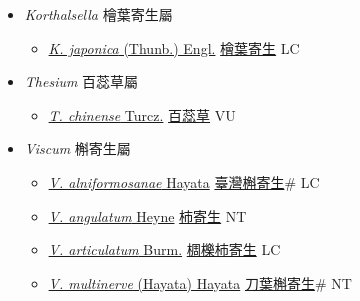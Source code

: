 
  \begin{itemize}
 \item[] \textit{Korthalsella} 檜葉寄生屬
                    
  \begin{itemize}
        \item[] \href{http://www.theplantlist.org/tpl1.1/search?q=Korthalsella+japonica}{\textit{K. japonica} (Thunb.) Engl.}   \href{\detokenize{http://taibnet.sinica.edu.tw/chi/taibnet_species_list.php?T2=檜葉寄生&T2_new_value=true&fr=y}}{檜葉寄生} LC
  \end{itemize}
 \item[] \textit{Thesium} 百蕊草屬
                    
  \begin{itemize}
        \item[] \href{http://www.theplantlist.org/tpl1.1/search?q=Thesium+chinense}{\textit{T. chinense} Turcz.}   \href{\detokenize{http://taibnet.sinica.edu.tw/chi/taibnet_species_list.php?T2=百蕊草&T2_new_value=true&fr=y}}{百蕊草} VU
  \end{itemize}
 \item[] \textit{Viscum} 槲寄生屬
                    
  \begin{itemize}
        \item[] \href{http://www.theplantlist.org/tpl1.1/search?q=Viscum+alniformosanae}{\textit{V. alniformosanae} Hayata}   \href{\detokenize{http://taibnet.sinica.edu.tw/chi/taibnet_species_list.php?T2=臺灣槲寄生&T2_new_value=true&fr=y}}{臺灣槲寄生}\# LC
        \item[] \href{http://www.theplantlist.org/tpl1.1/search?q=Viscum+angulatum}{\textit{V. angulatum} Heyne}   \href{\detokenize{http://taibnet.sinica.edu.tw/chi/taibnet_species_list.php?T2=柿寄生&T2_new_value=true&fr=y}}{柿寄生} NT
        \item[] \href{http://www.theplantlist.org/tpl1.1/search?q=Viscum+articulatum}{\textit{V. articulatum} Burm.}   \href{\detokenize{http://taibnet.sinica.edu.tw/chi/taibnet_species_list.php?T2=椆櫟柿寄生&T2_new_value=true&fr=y}}{椆櫟柿寄生} LC
        \item[] \href{http://www.theplantlist.org/tpl1.1/search?q=Viscum+multinerve}{\textit{V. multinerve} (Hayata) Hayata}   \href{\detokenize{http://taibnet.sinica.edu.tw/chi/taibnet_species_list.php?T2=刀葉槲寄生&T2_new_value=true&fr=y}}{刀葉槲寄生}\# NT
  \end{itemize}
  \end{itemize}
